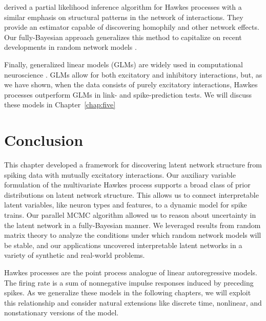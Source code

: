 \citet{Perry-2013} derived a partial likelihood inference algorithm
for Hawkes processes with a similar emphasis on structural patterns in
the network of interactions. They provide an estimator capable of
discovering homophily
and other network effects. Our fully-Bayesian approach generalizes
this method to capitalize on recent developments in random network
models \citep{Lloyd-2012}.

Finally, generalized linear models (GLMs) are widely used in
computational neuroscience \citep{Paninski-2004}. GLMs allow for both
excitatory and inhibitory interactions, but, as we have shown, when
the data consists of purely excitatory interactions, Hawkes processes
outperform GLMs in link- and spike-prediction tests. We will discuss
these models in Chapter~\ref{chap:five}


\section{Conclusion}

This chapter developed a framework for discovering latent network
structure from spiking data with mutually excitatory interactions. Our
auxiliary variable formulation of the multivariate Hawkes process
supports a broad class of prior distributions on latent network
structure. This allows us to connect interpretable latent variables,
like neuron types and features, to a dynamic model for spike trains.
Our parallel MCMC algorithm allowed us to reason about uncertainty in
the latent network in a fully-Bayesian manner.  We leveraged results
from random matrix theory to analyze the conditions under which random
network models will be stable, and our applications uncovered
interpretable latent networks in a variety of synthetic and real-world
problems.

Hawkes processes are the point process analogue of linear autoregressive
models. The firing rate is a sum of nonnegative impulse responses induced
by preceding spikes. As we generalize these models in the following
chapters, we will exploit this relationship and consider natural extensions
like discrete time, nonlinear, and nonstationary versions of the model.



